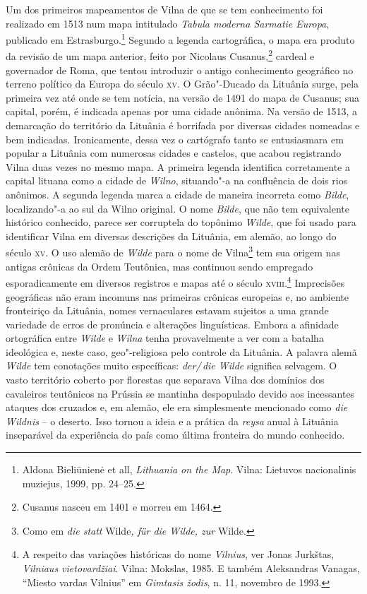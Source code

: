 Um dos primeiros mapeamentos de Vilna de que se tem conhecimento foi
realizado em 1513 num mapa intitulado \textit{Tabula moderna Sarmatie
Europa}, publicado em Estrasburgo.\footnote{Aldona Bieliūnienė et all, \textit{Lithuania on the Map}. Vilna: Lietuvos nacionalinis muziejus, 1999, pp. 24--25.} Segundo a legenda cartográfica, o mapa era produto da revisão de um mapa anterior, 
feito por Nicolaus Cusanus,\footnote{Cusanus nasceu em 1401 e morreu em 1464.} cardeal e governador de Roma, que tentou introduzir o
antigo conhecimento geográfico no terreno político da Europa do século
\textsc{xv}. O Grão"-Ducado da Lituânia surge, pela primeira vez até onde se tem
notícia, na versão de 1491 do mapa de Cusanus; sua capital, porém, é
indicada apenas por uma cidade anônima. Na versão de 1513, a demarcação
do território da Lituânia é borrifada por diversas cidades nomeadas e
bem indicadas. Ironicamente, dessa vez o cartógrafo tanto se
entusiasmara em popular a Lituânia com numerosas cidades e castelos, que
acabou registrando Vilna duas vezes no mesmo mapa. A primeira legenda
identifica corretamente a capital lituana como a cidade de \textit{Wilno},
situando"-a na confluência de dois rios anônimos. A segunda legenda marca
a cidade de maneira incorreta como \textit{Bilde}, localizando"-a ao sul da
Wilno original. O nome \textit{Bilde}, que não tem equivalente histórico
conhecido, parece ser corruptela do topônimo \textit{Wilde}, que foi usado
para identificar Vilna em diversas descrições da Lituânia, em alemão, ao
longo do século \textsc{xv}. O uso alemão de \textit{Wilde} para o nome de Vilna\footnote{Como em
\textit{die statt} Wilde\textit{, für die Wilde, zur} Wilde.} tem sua origem nas
antigas crônicas da Ordem Teutônica, mas continuou sendo empregado
esporadicamente em diversos registros e mapas até o século \textsc{xviii}.\footnote{A respeito das variações históricas do nome \textit{Vilnius}, ver Jonas Jurkštas, \textit{Vilniaus vietovardžiai}. Vilna: Mokslas, 1985. E também Aleksandras Vanagas, ``Miesto vardas Vilnius'' em \textit{Gimtasis žodis}, n. 11, novembro de 1993.}
Imprecisões geográficas não eram incomuns nas primeiras crônicas
europeias e, no ambiente fronteiriço da Lituânia, nomes vernaculares
estavam sujeitos a uma grande variedade de erros de pronúncia e
alterações linguísticas. Embora a afinidade ortográfica entre
\textit{Wilde} e \textit{Wilna} tenha provavelmente a ver com a
batalha ideológica e, neste caso, geo"-religiosa pelo controle da
Lituânia. A palavra alemã \textit{Wilde} tem conotações muito específicas:
\textit{der/\,die Wilde} significa selvagem. O vasto território coberto por
florestas que separava Vilna dos domínios dos cavaleiros teutônicos na
Prússia se mantinha despopulado devido aos incessantes ataques dos
cruzados e, em alemão, ele era simplesmente mencionado como \textit{die
Wildnis} -- o deserto. Isso tornou a ideia e a prática da \textit{reysa}
anual à Lituânia inseparável da experiência do país como última
fronteira do mundo conhecido.

